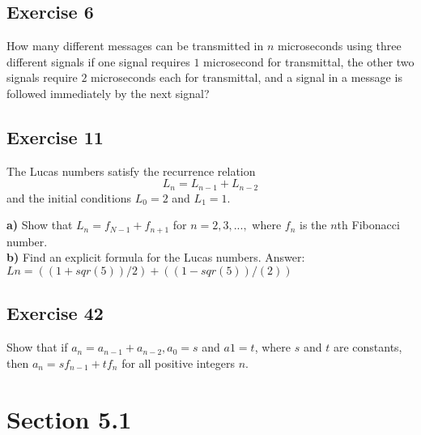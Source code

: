\documentclass[12pt]{article}
\begin{document}
    \subsection{Exercise 6} %
    How many different messages can be transmitted in $n$ microseconds using three different signals if one signal requires $1$ microsecond for transmittal, the other two signals require $2$ microseconds each for transmittal, and a signal in a message is followed immediately by the next signal?

    \subsection{Exercise 11}
    The Lucas numbers satisfy the recurrence relation
    \begin{equation}
        L_n=L_{n-1}+L_{n-2}
    \end{equation}
    and the initial conditions $L_0 = 2$ and $L_1=1$.

    \textbf{a)} Show that $L_n = f_{N-1}+f_{n+1}$ for $n=2,3,...,$ where $f_n$ is the $n$th Fibonacci number.\\
    \textbf{b)} Find an explicit formula for the Lucas numbers.
Answer: 
     $Ln = ((1+sqr(5))/2)+((1-sqr(5))/(2))$        

    \subsection{Exercise 42} %
    Show that if $a_n =a_{n-1} + a_{n-2}, a_0=s$ and $a1 =t$, where $s$ and $t$ are constants, then $a_n = sf_{n-1} + tf_n$ for all positive integers $n$.

    

    \section{Section 5.1} 
\end{document}

